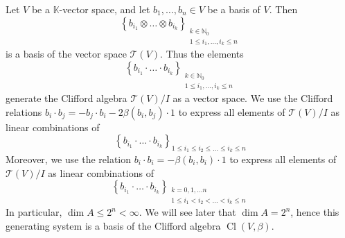 \documentclass[10pt, letterpaper]{article}
\begin{document}
Let $V$ be a $\mathbb{K}$-vector space, and let $b_{1}, \ldots, b_{n} \in V$ be a basis of $V$. Then
$$
\left\{b_{i_{1}} \otimes \ldots \otimes b_{i_{k}}\right\} \underset{\substack{k \in \mathbb{N}_{0} \\ 1 \leq i_{1}, \ldots, i_{k} \leq n}}{ }
$$
is a basis of the vector space $\mathcal{T}(V)$. Thus the elements
$$
\left\{b_{i_{1}} \cdot \ldots \cdot b_{i_{k}}\right\} \underset{\substack{k \in \mathbb{N}_{0} \\ 1 \leq i_{1}, \ldots, i_{k} \leq n}}{ }
$$
generate the Clifford algebra $\mathcal{T}(V) / I$ as a vector space. We use the Clifford relations $b_{i} \cdot b_{j}=-b_{j} \cdot b_{i}-2 \beta\left(b_{i}, b_{j}\right) \cdot 1$ to express all elements of $\mathcal{T}(V) / I$ as linear combinations of
$$
\left\{b_{i_{1}} \cdot \ldots \cdot b_{i_{k}}\right\} \underset{1 \leq i_{1} \leq i_{2} \leq \ldots \leq i_{k} \leq n}{ }
$$
Moreover, we use the relation $b_{i} \cdot b_{i}=-\beta\left(b_{i}, b_{i}\right) \cdot 1$ to express all elements of $\mathcal{T}(V) / I$ as linear combinations of
$$
\left\{b_{i_{1}} \cdot \ldots \cdot b_{i_{k}}\right\}_{\substack{k=0,1, \ldots n \\ 1 \leq i_{1}<i_{2}<\ldots<i_{k} \leq n}}
$$
In particular, $\operatorname{dim} A \leq 2^{n}<\infty$. We will see later that $\operatorname{dim} A=2^{n}$, hence this generating system is a basis of the Clifford algebra $\operatorname{Cl}(V, \beta)$.
\end{document}
